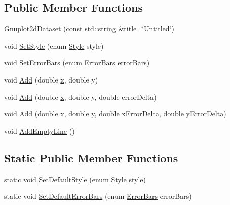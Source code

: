 \subsection*{Public Member Functions}
\begin{DoxyCompactItemize}
\item 
\hyperlink{classns3_1_1Gnuplot2dDataset_af89f0de991251f5ed1acae64fde25003}{Gnuplot2d\+Dataset} (const std\+::string \&\hyperlink{lte__link__budget__x2__handover__measures_8m_a3f4b991df405379f6917e1683ed5a8c8}{title}=\char`\"{}Untitled\char`\"{})
\item 
void \hyperlink{classns3_1_1Gnuplot2dDataset_a7a3d6b6c2bd7d32a82f5715bae37c886}{Set\+Style} (enum \hyperlink{classns3_1_1Gnuplot2dDataset_abdad90b4b2abed9a198e4b19470de882}{Style} style)
\item 
void \hyperlink{classns3_1_1Gnuplot2dDataset_a4d9c142d7065fa95845b291b5b159b4a}{Set\+Error\+Bars} (enum \hyperlink{classns3_1_1Gnuplot2dDataset_a5984738d258811bed5eff163d4e3d648}{Error\+Bars} error\+Bars)
\item 
void \hyperlink{classns3_1_1Gnuplot2dDataset_abd93f7c8fa2d1ed643c09d7fb8d5ef27}{Add} (double \hyperlink{lte__link__budget__x2__handover__measures_8m_a9336ebf25087d91c818ee6e9ec29f8c1}{x}, double y)
\item 
void \hyperlink{classns3_1_1Gnuplot2dDataset_ace067b8be3898a338fa6058f58944764}{Add} (double \hyperlink{lte__link__budget__x2__handover__measures_8m_a9336ebf25087d91c818ee6e9ec29f8c1}{x}, double y, double error\+Delta)
\item 
void \hyperlink{classns3_1_1Gnuplot2dDataset_a226a2356067f4930775716e895743a57}{Add} (double \hyperlink{lte__link__budget__x2__handover__measures_8m_a9336ebf25087d91c818ee6e9ec29f8c1}{x}, double y, double x\+Error\+Delta, double y\+Error\+Delta)
\item 
void \hyperlink{classns3_1_1Gnuplot2dDataset_a00f09ab2fa55ac9ba570ad966c476527}{Add\+Empty\+Line} ()
\end{DoxyCompactItemize}
\subsection*{Static Public Member Functions}
\begin{DoxyCompactItemize}
\item 
static void \hyperlink{classns3_1_1Gnuplot2dDataset_aa3a2342a438fda8499db57137d86bb81}{Set\+Default\+Style} (enum \hyperlink{classns3_1_1Gnuplot2dDataset_abdad90b4b2abed9a198e4b19470de882}{Style} style)
\item 
static void \hyperlink{classns3_1_1Gnuplot2dDataset_ae756ce6954c7953bb45ac300234f2337}{Set\+Default\+Error\+Bars} (enum \hyperlink{classns3_1_1Gnuplot2dDataset_a5984738d258811bed5eff163d4e3d648}{Error\+Bars} error\+Bars)
\end{DoxyCompactItemize}
